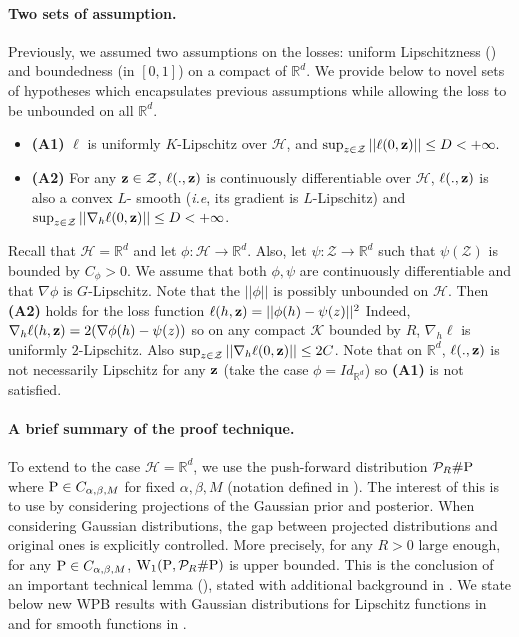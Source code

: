 \paragraph{Two sets of assumption.} Previously, we assumed two assumptions on the losses: uniform Lipschitzness () and boundedness (in $[0,1]$) on a compact of $\mathbb{R}^d$. We provide below to novel sets of hypotheses which encapsulates previous assumptions while allowing the loss to be unbounded on all $\mathbb{R}^d$.
\begin{itemize}
  \item \textbf{(A1)} $\ell$ is uniformly $K$-Lipschitz over  $\mathcal{H}$, and $\sup_{z\in\mathcal{Z}} || \ell(0,\z)|| \leq D< +\infty.$
  \item \textbf{(A2)} For any $\z\in\mathcal{Z}$, $\ell(.,\z)$ is continuously differentiable over $\mathcal{H}$, $\ell(.,\z)$ is also a convex $L$- smooth (\emph{i.e}, its gradient is $L$-Lipschitz) and $\sup_{z\in\mathcal{Z}} ||\nabla_h \ell(0,\z)|| \leq D< +\infty$.
\end{itemize}
\begin{example}
Recall that $\mathcal{H}=\mathbb{R}^d$ and let $\phi:\mathcal{H}\rightarrow \mathbb{R}^d$.
Also, let $\psi :\mathcal{Z}\rightarrow \mathbb{R}^d$ such that $\psi(\mathcal{Z})$ is bounded by $C_\phi >0$. We assume that both $\phi,\psi$ are continuously differentiable and that $\nabla\phi$ is $G$-Lipschitz.
Note that the $||\phi||$ is possibly unbounded on $\mathcal{H}$.
Then \textbf{(A2)} holds for the loss function $\ell(h,\z)= ||\phi(h)-\psi(z)||^2$
Indeed, $\nabla_h \ell(h,\z)= 2(\nabla\phi (h) -\psi(z))$ so on any compact $\mathcal{K}$ bounded by $R$, $\nabla_h \ell$ is uniformly $2$-Lipschitz. Also $\sup_{z\in\mathcal{Z}} ||\nabla_h \ell(0,\z)|| \leq 2C$.
Note that on $\mathbb{R}^d$, $\ell(.,\z)$ is not necessarily Lipschitz for any $\z$ (take the case $\phi= Id_{\mathbb{R}^d}$) so \textbf{(A1)} is not satisfied.
\end{example}


\paragraph{A brief summary of the proof technique.} To extend  to the case $\mathcal{H}=\mathbb{R}^d$, we use the push-forward distribution $\mathcal{P}_{R} \# \P$ where $\P\in C_{\alpha,\beta,M}$ for fixed $\alpha,\beta,M$ (notation defined in ).
The interest of this is to use  by considering projections of the Gaussian prior and posterior. When considering Gaussian distributions, the gap between projected distributions and original ones is explicitly controlled.
More precisely, for any $R>0$ large enough, for any $\P\in C_{\alpha,\beta, M}$, $\W_{1}(\P, \mathcal{P}_{R}\# \P)$ is upper bounded. This is the conclusion of an important technical lemma (), stated with additional background in .
We state below new WPB results with Gaussian distributions for Lipschitz functions in  and for smooth functions in .

